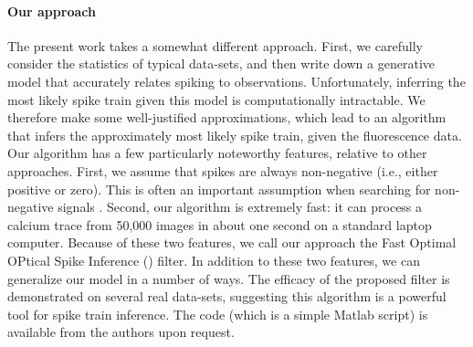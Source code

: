 \paragraph{Our approach}

The present work takes a somewhat different approach.  First, we carefully consider the statistics of typical data-sets, and then write down a generative model that accurately relates spiking to observations. Unfortunately, inferring the most likely spike train given this model is computationally intractable.  We therefore make some well-justified approximations, which lead to an algorithm that infers the approximately most likely spike train, given the fluorescence data.  Our algorithm has a few particularly noteworthy features, relative to other approaches.  First, we assume that spikes are always non-negative (i.e., either positive or zero).  This is often an important assumption when searching for non-negative signals \cite{LeeSeung99, LeeSeung01, HuysPaninski06}.  Second, our algorithm is extremely fast: it can process a calcium trace from 50,000 images in about one second on a standard laptop computer.  Because of these two features, we call our approach the Fast Optimal OPtical Spike Inference (\foopsi) filter. In addition to these two features, we can generalize our model in a number of ways. The efficacy of the proposed filter is demonstrated on several real data-sets, suggesting this algorithm is a powerful tool for spike train inference.  The code (which is a simple Matlab script) is available from the authors upon request. 